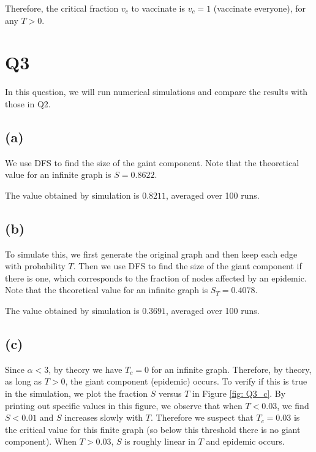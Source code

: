 \documentclass{article}
\begin{document}
Therefore, the critical fraction $ v_c $ to vaccinate is $ v_c = 1 $ (vaccinate everyone), for any $ T>0 $.

\section*{Q3}
In this question, we will run numerical simulations and compare the results with those in Q2. 

\subsection*{(a)}
We use DFS to find the size of the gaint component. Note that the theoretical value for an infinite graph is $ S = 0.8622 $.

The value obtained by simulation is $ 0.8211 $, averaged over 100 runs.

\subsection*{(b)} 
To simulate this, we first generate the original graph and then keep each edge with probability $ T $. Then we use DFS to find the size of the giant component if there is one, which corresponds to the fraction of nodes affected by an epidemic. Note that the theoretical value for an infinite graph is $ S_T = 0.4078 $.

The value obtained by simulation is $ 0.3691 $, averaged over 100 runs.

\subsection*{(c)}
Since $ \alpha < 3 $, by theory we have $ T_c =0 $ for an infinite graph. Therefore, by theory, as long as $ T>0 $, the giant component (epidemic) occurs. To verify if this is true in the simulation, we plot the fraction $ S $ versus $ T $ in Figure \ref{fig: Q3_c}. By printing out specific values in this figure, we observe that when $ T<0.03 $, we find $ S<0.01 $ and $ S $ increases slowly with $ T $. Therefore we suspect that $ T_c = 0.03 $ is the critical value for this finite graph (so below this threshold there is no giant component). When $ T>0.03 $, $ S $ is roughly linear in $ T $ and epidemic occurs.
\end{document}
